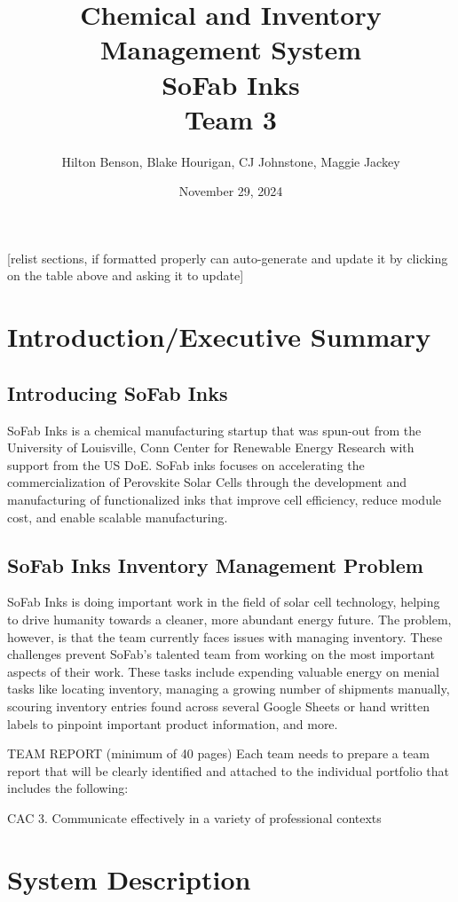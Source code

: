 \documentclass{article}
\title{Chemical and Inventory Management System \\ SoFab Inks \\ Team 3}
\date{November 29, 2024}
\author{Hilton Benson, Blake Hourigan, CJ Johnstone, Maggie Jackey}
\begin{document}
  
\maketitle
\clearpage
\tableofcontents
\clearpage

[relist sections, if formatted properly can auto-generate and update it by clicking on the table above and asking it to update] 

\section{Introduction\slash Executive Summary} 
\subsection{Introducing SoFab Inks}
SoFab Inks is a chemical manufacturing startup that was spun-out from the University of Louisville, Conn Center for Renewable Energy 
Research with support from the US DoE. SoFab inks focuses on accelerating the commercialization of Perovskite Solar Cells 
through the development and manufacturing of functionalized inks that improve cell efficiency, reduce module cost, and enable scalable 
manufacturing. \cite{sofabinks}
\subsection{SoFab Inks Inventory Management Problem}
SoFab Inks is doing important work in the field of solar cell technology, helping to drive humanity towards a cleaner, more abundant
energy future. The problem, however, is that the team currently faces issues with managing inventory. These challenges prevent SoFab's
talented team from working on the most important aspects of their work. These tasks include expending valuable energy on menial 
tasks like locating inventory, managing a growing number of shipments manually, scouring inventory entries found across several 
Google Sheets or hand written labels to pinpoint important product information, and more. 




TEAM REPORT (minimum of 40 pages) 
Each team needs to prepare a team report that will be clearly identified and attached to the 
individual portfolio that includes the following: 

CAC 3. Communicate effectively in a variety of professional contexts 

\section{System Description}
\end{document}
